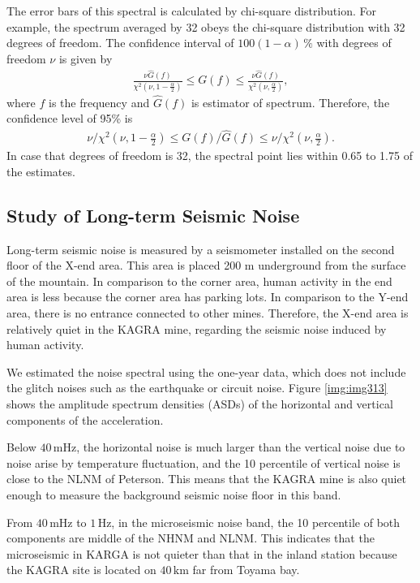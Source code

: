 The error bars of this spectral is calculated by chi-square distribution. For example, the spectrum averaged by 32 obeys the chi-square distribution with 32 degrees of freedom. The confidence interval of $100(1-\alpha)\,\%$ with degrees of freedom $\nu$ is given by 
\begin{eqnarray}
  \frac{\nu{\hat{G}(f)}}{\chi^2(\nu,1-\frac{\alpha}{2})} \leq G(f) \leq \frac{\nu{\hat{G}(f)}}{\chi^2(\nu,\frac{\alpha}{2})},
\end{eqnarray}
where $f$ is the frequency and $\hat{G}(f)$ is estimator of spectrum. Therefore, the confidence level of 95\% is 
\begin{eqnarray}
  \nu/\chi^2(\nu,1-\frac{\alpha}{2}) \leq G(f)/\hat{G}(f) \leq \nu/\chi^2(\nu,\frac{\alpha}{2}).
\end{eqnarray}
In case that degrees of freedom is 32, the spectral point lies within 0.65 to 1.75 of the estimates.

\subsection{Study of Long-term Seismic Noise}
Long-term seismic noise is measured by a seismometer installed on the second floor of the X-end area. This area is placed 200 $\mathrm{m}$ underground from the surface of the mountain. In comparison to the corner area, human activity in the end area is less because the corner area has parking lots. In comparison to the Y-end area, there is no entrance connected to other mines. Therefore, the X-end area is relatively quiet in the KAGRA mine, regarding the seismic noise induced by human activity. 

We estimated the noise spectral using the one-year data, which does not include the glitch noises such as the earthquake or circuit noise. Figure \ref{img:img313} shows the amplitude spectrum densities (ASDs) of the horizontal and vertical components of the acceleration.

Below $40\,\mathrm{mHz}$, the horizontal noise is much larger than the vertical noise due to noise arise by temperature fluctuation, and the 10 percentile of vertical noise is close to the NLNM of Peterson. This means that the KAGRA mine is also quiet enough to measure the background seismic noise floor in this band.

From $40\,\mathrm{mHz}$ to $1\,\mathrm{Hz}$, in the microseismic noise band, the 10 percentile of both components are middle of the NHNM and NLNM. This indicates that the microseismic in KARGA is not quieter than that in the inland station because the KAGRA site is located on $40\,\mathrm{km}$ far from Toyama bay. 

